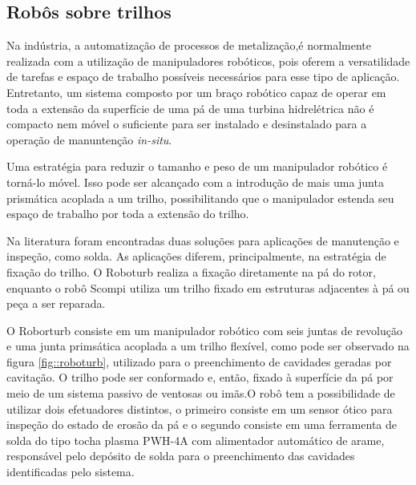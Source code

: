 \subsection{Robôs sobre trilhos}


Na indústria, a automatização de processos de metalização,é
normalmente realizada com a utilização de manipuladores robóticos, pois oferem a
versatilidade de tarefas e espaço de trabalho possíveis necessários para esse
tipo de aplicação. Entretanto, um sistema composto por um braço robótico capaz
de operar em toda a extensão da superfície de uma pá de uma turbina hidrelétrica
não é compacto nem móvel o suficiente para ser instalado e desinstalado para a
operação de manuntenção \textit{in-situ}.

Uma estratégia para reduzir o tamanho e peso de um manipulador robótico é
torná-lo móvel. Isso pode ser alcançado com a introdução de mais uma junta
prismática acoplada a um trilho, possibilitando que o manipulador estenda seu
espaço de trabalho por toda a extensão do trilho.

Na literatura foram encontradas duas soluções para aplicações de manutenção e
inspeção, como solda. As aplicações diferem, principalmente, na estratégia de
fixação do trilho. O Roboturb \cite{roboturb} realiza a fixação diretamente na
pá do rotor, enquanto o robô Scompi \cite{scompi} utiliza um trilho fixado em
estruturas adjacentes à pá ou peça a ser reparada.

O Roborturb consiste em um manipulador robótico com seis juntas de revolução e
uma junta primsática acoplada a um trilho flexível, como pode ser observado
na figura \ref{fig::roboturb}, utilizado para o preenchimento de cavidades
geradas por cavitação.
O trilho pode ser conformado e, então, fixado à superfície da pá por meio de um
 sistema passivo de ventosas ou imãs.O robô tem 
a possibilidade de utilizar dois efetuadores distintos, o primeiro consiste em 
um sensor ótico para inspeção do estado de erosão da pá e o segundo consiste em
uma ferramenta de solda do tipo tocha plasma PWH-4A com alimentador automático
de arame, responsável pelo depósito de solda para o preenchimento das cavidades
identificadas pelo sistema.

